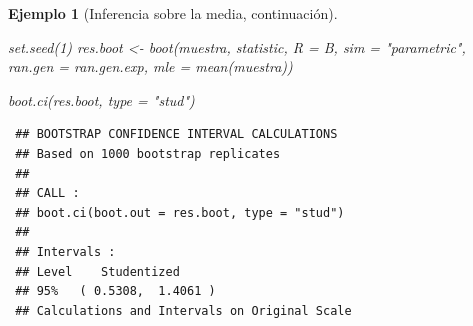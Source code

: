 \documentclass[
  10pt,
]{book}
\newenvironment{Shaded}{\begin{snugshade}}{\end{snugshade}}
\newcommand{\AttributeTok}[1]{\textcolor[rgb]{0.77,0.63,0.00}{#1}}
\newcommand{\DecValTok}[1]{\textcolor[rgb]{0.00,0.00,0.81}{#1}}
\newcommand{\FunctionTok}[1]{\textcolor[rgb]{0.00,0.00,0.00}{#1}}
\newcommand{\NormalTok}[1]{#1}
\newcommand{\OtherTok}[1]{\textcolor[rgb]{0.56,0.35,0.01}{#1}}
\newcommand{\StringTok}[1]{\textcolor[rgb]{0.31,0.60,0.02}{#1}}
\theoremstyle{break}
\newtheorem{example}{Ejemplo}[chapter]
\theoremstyle{nonumberplain}
\begin{document}
\begin{example}[Inferencia sobre la media, continuación]
\begin{Shaded}
\begin{Highlighting}[]
\FunctionTok{set.seed}\NormalTok{(}\DecValTok{1}\NormalTok{)}
\NormalTok{res.boot }\OtherTok{\textless{}{-}} \FunctionTok{boot}\NormalTok{(muestra, statistic, }\AttributeTok{R =}\NormalTok{ B, }\AttributeTok{sim =} \StringTok{"parametric"}\NormalTok{,}
                 \AttributeTok{ran.gen =}\NormalTok{ ran.gen.exp, }\AttributeTok{mle =} \FunctionTok{mean}\NormalTok{(muestra))}

\FunctionTok{boot.ci}\NormalTok{(res.boot, }\AttributeTok{type =} \StringTok{"stud"}\NormalTok{)}
\end{Highlighting}
\end{Shaded}

\begin{verbatim}
 ## BOOTSTRAP CONFIDENCE INTERVAL CALCULATIONS
 ## Based on 1000 bootstrap replicates
 ## 
 ## CALL : 
 ## boot.ci(boot.out = res.boot, type = "stud")
 ## 
 ## Intervals : 
 ## Level    Studentized     
 ## 95%   ( 0.5308,  1.4061 )  
 ## Calculations and Intervals on Original Scale
\end{verbatim}

\end{example}
\end{document}
